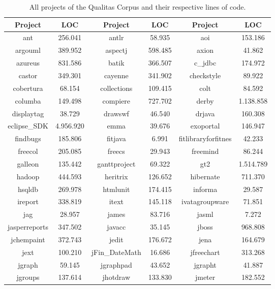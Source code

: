 \setlength{\extrarowheight}{-0.02em}
\begin{table}
	\caption{All projects of the Qualitas Corpus and their respective lines of code.}
	\label{table:qualitasCorpusAll}
	\begin{tabularx}{\textwidth}{c|c||c|c||C|c}
		\textbf{Project} & \textbf{LOC} & \textbf{Project} & \textbf{LOC} & \textbf{Project} & \textbf{LOC} \\
		\hline
		ant & 256.041 & antlr & 58.935 & aoi & 153.186 \\
		argouml & 389.952 & aspectj & 598.485 & axion & 41.862 \\
		azureus & 831.586 & batik & 366.507 & c\_jdbc & 174.972 \\
		castor & 349.301 & cayenne & 341.902 & checkstyle & 89.922 \\
		cobertura & 68.154 & collections & 109.415 & colt & 84.592 \\
		columba & 149.498 & compiere & 727.702 & derby & 1.138.858 \\
		displaytag & 38.729 & drawswf & 46.540 & drjava & 160.308 \\
		eclipse\_SDK & 4.956.920 & emma & 39.676 & exoportal & 146.947 \\
		findbugs & 185.806 & fitjava & 6.991 & fitlibraryforfitnes & 42.233 \\
		freecol & 205.085 & freecs & 29.943 & freemind & 86.244 \\
		galleon & 135.442 & ganttproject & 69.322 & gt2 & 1.514.789 \\
		hadoop & 444.593 & heritrix & 126.652 & hibernate & 711.370 \\
		hsqldb & 269.978 & htmlunit & 174.415 & informa & 29.587 \\
		ireport & 338.819 & itext & 145.118 & ivatagroupware & 71.851 \\
		jag & 28.957 & james & 83.716 & jasml & 7.272 \\
		jasperreports & 347.502 & javacc & 35.145 & jboss & 968.808 \\
		jchempaint & 372.743 & jedit & 176.672 & jena & 164.679 \\
		jext & 100.210 & jFin\_DateMath & 16.686 & jfreechart & 313.268 \\
		jgraph & 59.145 & jgraphpad & 43.652 & jgrapht & 41.887 \\
		jgroups & 137.614 & jhotdraw & 133.830 & jmeter & 182.552 \\

\end{tabularx}
\end{table}
